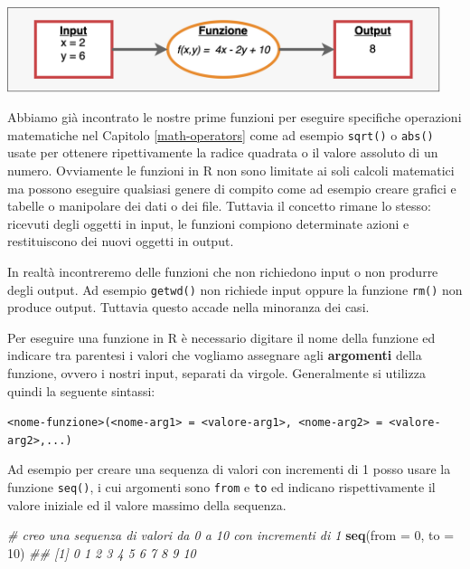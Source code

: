 \documentclass[
]{book}
\newenvironment{Shaded}{\begin{snugshade}}{\end{snugshade}}
\newcommand{\CommentTok}[1]{\textcolor[rgb]{0.56,0.35,0.01}{\textit{#1}}}
\newcommand{\DataTypeTok}[1]{\textcolor[rgb]{0.13,0.29,0.53}{#1}}
\newcommand{\DecValTok}[1]{\textcolor[rgb]{0.00,0.00,0.81}{#1}}
\newcommand{\KeywordTok}[1]{\textcolor[rgb]{0.13,0.29,0.53}{\textbf{#1}}}
\newcommand{\NormalTok}[1]{#1}
\begin{document}
\includegraphics[width=0.95\textwidth,height=\textheight]{images/functions-graph.png}

Abbiamo già incontrato le nostre prime funzioni per eseguire specifiche operazioni matematiche nel Capitolo \ref{math-operators} come ad esempio \texttt{sqrt()} o \texttt{abs()} usate per ottenere ripettivamente la radice quadrata o il valore assoluto di un numero. Ovviamente le funzioni in R non sono limitate ai soli calcoli matematici ma possono eseguire qualsiasi genere di compito come ad esempio creare grafici e tabelle o manipolare dei dati o dei file. Tuttavia il concetto rimane lo stesso: ricevuti degli oggetti in input, le funzioni compiono determinate azioni e restituiscono dei nuovi oggetti in output.

In realtà incontreremo delle funzioni che non richiedono input o non produrre degli output. Ad esempio \texttt{getwd()} non richiede input oppure la funzione \texttt{rm()} non produce output. Tuttavia questo accade nella minoranza dei casi.

Per eseguire una funzione in R è necessario digitare il nome della funzione ed indicare tra parentesi i valori che vogliamo assegnare agli \textbf{argomenti} della funzione, ovvero i nostri input, separati da virgole. Generalmente si utilizza quindi la seguente sintassi:

\texttt{\textless{}nome-funzione\textgreater{}(\textless{}nome-arg1\textgreater{}\ =\ \textless{}valore-arg1\textgreater{},\ \textless{}nome-arg2\textgreater{}\ =\ \textless{}valore-arg2\textgreater{},...)}

{}

Ad esempio per creare una sequenza di valori con incrementi di 1 posso usare la funzione \texttt{seq()}, i cui argomenti sono \texttt{from} e \texttt{to} ed indicano rispettivamente il valore iniziale ed il valore massimo della sequenza.

\begin{Shaded}
\begin{Highlighting}[]
\CommentTok{# creo una sequenza di valori da 0 a 10 con incrementi di 1}
\KeywordTok{seq}\NormalTok{(}\DataTypeTok{from =} \DecValTok{0}\NormalTok{, }\DataTypeTok{to =} \DecValTok{10}\NormalTok{)}
\CommentTok{##  [1]  0  1  2  3  4  5  6  7  8  9 10}
\end{Highlighting}
\end{Shaded}
\end{document}
